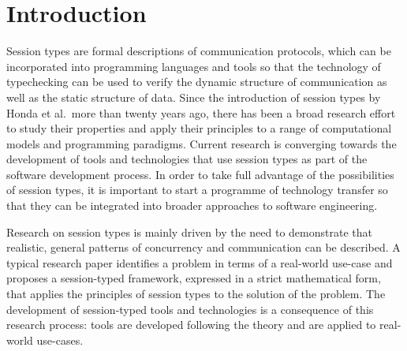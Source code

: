 
\section{Introduction}

Session types are formal descriptions of communication protocols, which can be incorporated into programming languages and tools so that the technology of typechecking can be used to verify the dynamic structure of communication as well as the static structure of data. Since the introduction of session types by Honda et al.\ more than twenty years ago, there has been a broad research effort to study their properties and apply their principles to a range of computational models and programming paradigms. Current research is converging towards the development of tools and technologies that use session types as part of the software development process. In order to take full advantage of the possibilities of session types, it is important to start a programme of technology transfer so that they can be integrated into broader approaches to software engineering.


Research on session types is mainly driven by the need to demonstrate that realistic, general patterns of concurrency and communication can be described. A typical research paper identifies a problem in terms of a real-world use-case and proposes a session-typed framework, expressed in a strict mathematical form, that applies the principles of session types to the solution of the problem. The development of session-typed tools and technologies is a consequence of this research process: tools are developed following the theory and are applied to real-world use-cases.

